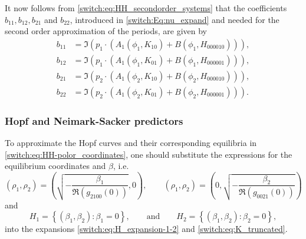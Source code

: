 It now follows from \cref{switch:eq:HH_secondorder_systems} that the coefficients $b_{11},b_{12},b_{21}$ and $b_{22}$, introduced in \cref{switch:Eq:nu_expand} and needed for the second order approximation of the periods, are given by
\begin{align*}
b_{11} & =\Im\left(p_{1}\cdot \left(A_{1}(\phi_{1},K_{10})+B(\phi_{1},H_{000010})\right)\right),\\
b_{12} & =\Im\left(p_{1}\cdot \left(A_{1}(\phi_{1},K_{01})+B(\phi_{1},H_{000001})\right)\right),\\
b_{21} & =\Im\left(p_{2}\cdot \left(A_{1}(\phi_{2},K_{10})+B(\phi_{2},H_{000010})\right)\right),\\
b_{22} & =\Im\left(p_{2}\cdot \left(A_{1}(\phi_{2},K_{01})+B(\phi_{2},H_{000001})\right)\right).
\end{align*}

\subsubsection{Hopf and Neimark-Sacker predictors\label{switch:sec:HH_pedictors}}
To approximate the Hopf curves and their corresponding equilibria in \cref{switch:eq:HH-polor_coordinates}, one should substitute the expressions for the equilibrium coordinates and $\beta$, i.e.
\[
(\rho_{1},\rho_{2})=\left(\sqrt{-\frac{\beta_{1}}{\Re(g_{2100}(0))}},0\right),\qquad(\rho_{1},\rho_{2})=\left(0,\sqrt{-\frac{\beta_{2}}{\Re(g_{0021}(0))}}\right)
\]
and
\[
H_{1}=\left\{ \left(\beta_{1},\beta_{2}\right):\beta_{1}=0\right\} ,\qquad\text{and}\qquad H_{2}=\left\{ \left(\beta_{1},\beta_{2}\right):\beta_{2}=0\right\},
\]
into the expansions \cref{switch:eq:H_expansion-1-2} and \cref{switch:eq:K_truncated}. 

